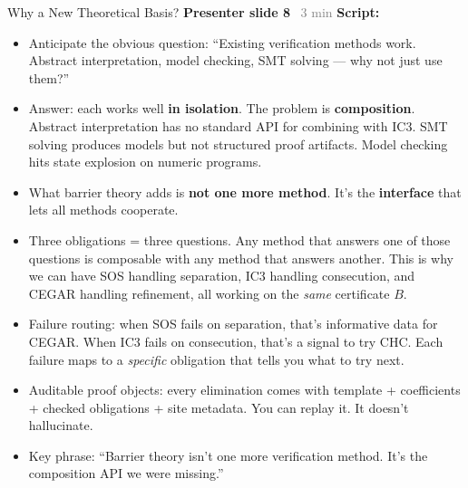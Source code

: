 \documentclass[aspectratio=169]{beamer}
\newcommand{\syncline}[2]{\textbf{#1} \hfill \textcolor{gray}{#2}}
\begin{document}

\begin{frame}{Why a New Theoretical Basis?}
\syncline{Presenter slide 8}{~3 min}
\textbf{Script:}
\begin{itemize}
  \item Anticipate the obvious question: ``Existing verification methods work. Abstract interpretation, model checking, SMT solving --- why not just use them?''
  \item Answer: each works well \textbf{in isolation}. The problem is \textbf{composition}. Abstract interpretation has no standard API for combining with IC3. SMT solving produces models but not structured proof artifacts. Model checking hits state explosion on numeric programs.
  \item What barrier theory adds is \textbf{not one more method}. It's the \textbf{interface} that lets all methods cooperate.
  \item Three obligations = three questions. Any method that answers one of those questions is composable with any method that answers another. This is why we can have SOS handling separation, IC3 handling consecution, and CEGAR handling refinement, all working on the \emph{same} certificate $B$.
  \item Failure routing: when SOS fails on separation, that's informative data for CEGAR. When IC3 fails on consecution, that's a signal to try CHC. Each failure maps to a \emph{specific} obligation that tells you what to try next.
  \item Auditable proof objects: every elimination comes with template + coefficients + checked obligations + site metadata. You can replay it. It doesn't hallucinate.
  \item Key phrase: ``Barrier theory isn't one more verification method. It's the composition API we were missing.''
\end{itemize}
\end{frame}

\end{document}
